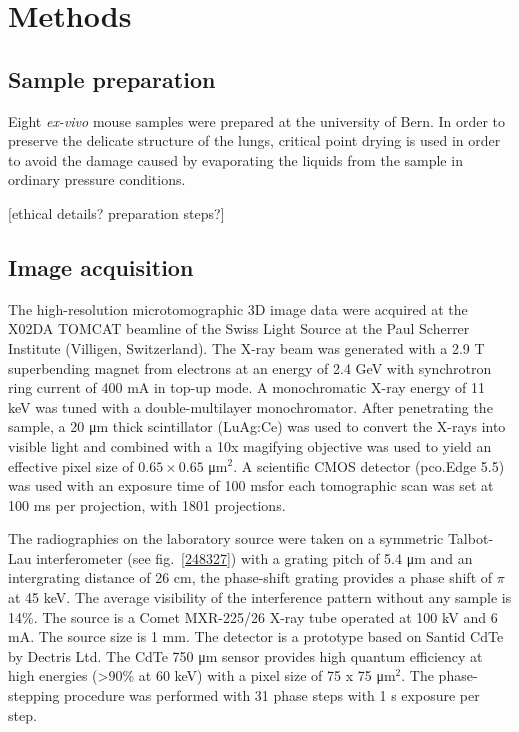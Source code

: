 \section{Methods}\label{sec:methods}
\subsection{Sample preparation}
Eight \emph{ex-vivo} mouse samples were prepared at the university of Bern.
In order to preserve the delicate structure of the lungs, critical point
drying is used in order to avoid the damage caused by evaporating the liquids
from the sample in ordinary pressure conditions.

[ethical details? preparation steps?]

\subsection{Image acquisition}\label{sec:acquisition}
The high-resolution microtomographic 3D image data were acquired at the X02DA
TOMCAT beamline of the Swiss Light Source at the Paul Scherrer Institute
(Villigen, Switzerland). The X-ray beam was generated with a 2.9 T superbending
magnet from electrons at an energy of 2.4 GeV with synchrotron ring current of 400 mA in top-up mode. A monochromatic X-ray energy of 11 keV was tuned with a double-multilayer monochromator. After penetrating the sample, a 20 μm thick scintillator (LuAg:Ce) was used to convert the X-rays into visible light and combined with a 10x magifying objective was used to yield an effective pixel size of $0.65 \times 0.65$
μm$^2$. A scientific CMOS detector (pco.Edge 5.5) was used with an exposure time of 100 msfor each tomographic scan was set at 100 ms per
projection, with 1801 projections.

The radiographies on the laboratory source were taken on a symmetric
Talbot-Lau interferometer (see fig.~\ref{248327}) with a grating pitch of 5.4 μm and an intergrating
distance of 26 cm, the phase-shift grating provides a phase shift of $\pi$
at 45 keV. The average visibility of the interference pattern without any
sample is 14\%. The source is a Comet MXR-225/26 X-ray tube operated at 100
kV and 6 mA. The source size is 1 mm. The detector is a prototype based on
Santid CdTe by Dectris Ltd. The CdTe 750 μm sensor provides high quantum
efficiency at high energies (>90\% at 60 keV) with a pixel size of 75 x 75
μm$^2$. The phase-stepping procedure was performed with 31 phase steps with
1 s exposure per step.
